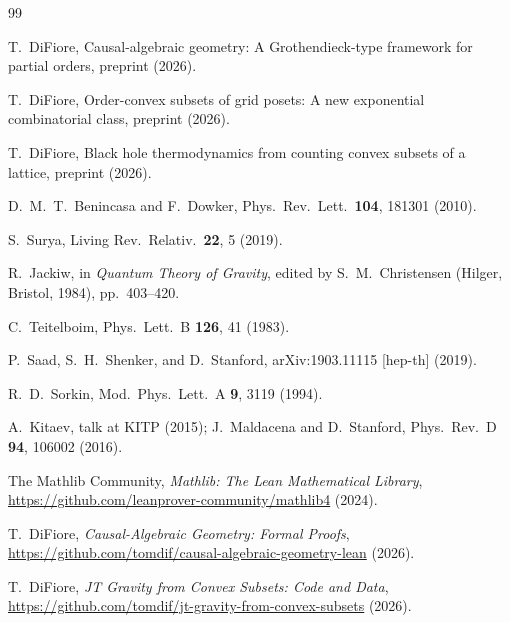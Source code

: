 \documentclass[aps,prd,twocolumn,superscriptaddress]{revtex4-2}
\begin{document}
\begin{thebibliography}{99}

T.~DiFiore,
Causal-algebraic geometry: A Grothendieck-type framework for partial
orders, preprint (2026).

T.~DiFiore,
Order-convex subsets of grid posets: A new exponential combinatorial
class, preprint (2026).

T.~DiFiore,
Black hole thermodynamics from counting convex subsets of a lattice,
preprint (2026).

D.~M.~T.~Benincasa and F.~Dowker,
Phys.\ Rev.\ Lett.\ \textbf{104}, 181301 (2010).

S.~Surya,
Living Rev.\ Relativ.\ \textbf{22}, 5 (2019).

R.~Jackiw, in \emph{Quantum Theory of Gravity},
edited by S.~M.~Christensen (Hilger, Bristol, 1984), pp.~403--420.

C.~Teitelboim,
Phys.\ Lett.\ B \textbf{126}, 41 (1983).

P.~Saad, S.~H.~Shenker, and D.~Stanford,
arXiv:1903.11115 [hep-th] (2019).

R.~D.~Sorkin,
Mod.\ Phys.\ Lett.\ A \textbf{9}, 3119 (1994).

A.~Kitaev,
talk at KITP (2015);
J.~Maldacena and D.~Stanford,
Phys.\ Rev.\ D \textbf{94}, 106002 (2016).

The Mathlib Community,
\emph{Mathlib: The Lean Mathematical Library},
\url{https://github.com/leanprover-community/mathlib4} (2024).

T.~DiFiore,
\emph{Causal-Algebraic Geometry: Formal Proofs},
\url{https://github.com/tomdif/causal-algebraic-geometry-lean} (2026).

T.~DiFiore,
\emph{JT Gravity from Convex Subsets: Code and Data},
\url{https://github.com/tomdif/jt-gravity-from-convex-subsets} (2026).

\end{thebibliography}
\end{document}
